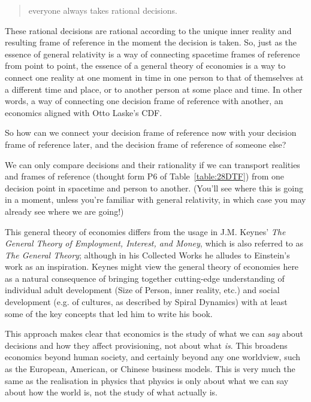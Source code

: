\begin{quotation}
everyone always takes rational decisions. 
\end{quotation}


These rational decisions are rational according to the unique inner reality and resulting frame of reference in the moment the decision is taken. So, just as the essence of general relativity is a way of connecting spacetime frames of reference from point to point, the essence of a general theory of economies is a way to connect one reality at one moment in time in one person to that of themselves at a different time and place,  or to another person at some place and time. In other words, a way of connecting one decision frame of reference  with another, an economics aligned with Otto Laske's CDF.  


So how can we connect your decision frame of reference now with your decision frame of reference later, and the decision frame of reference of someone else?


We can only compare decisions and their rationality if we can transport realities and frames of reference  (thought form P6 of Table~\ref{table:28DTF}) from one decision point in spacetime and person to another. (You'll see where this is going in a moment, unless you're familiar with general relativity, in which case you may already see where we are going!)


This general theory of economies  differs from the usage in J.M. Keynes’ \emph{The General Theory of Employment, Interest, and Money}\cite{keynes-general}, which is also referred to as \emph{The General Theory}; although in his Collected Works he alludes to Einstein’s work as an inspiration. Keynes  might view the general theory of economies here as a natural consequence of bringing together cutting\hyp{}edge understanding of individual adult development (Size of Person, inner reality, etc.) and  social development (e.g. of cultures, as described by Spiral Dynamics) with at least some of the key concepts that led him to write his book\cite{galbraith-keynes, keynes-collected-writing}.  


This approach makes clear that economics is the study of what we can \emph{say} about decisions and how they affect provisioning, not about what \emph{is}. This broadens economics beyond human society, and certainly beyond any one worldview, such as the European, American, or Chinese business models. This is very much the same as the realisation in physics that physics is only about what we can say about how the world is, not the study of what actually is.


